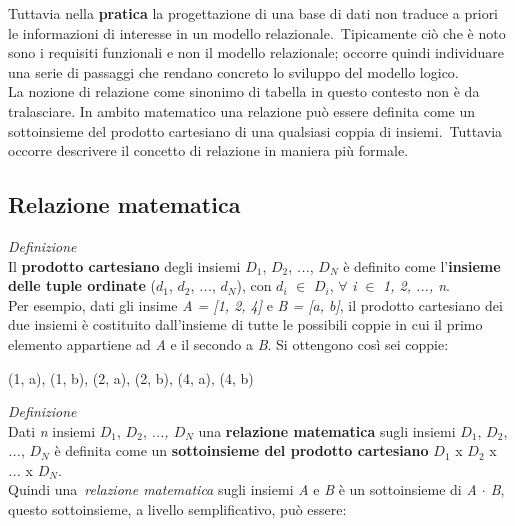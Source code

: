 \documentclass{article}
\begin{document}
Tuttavia nella \textbf{pratica} la progettazione di una base di dati non traduce a priori le informazioni di interesse in un modello relazionale.\ Tipicamente ciò che è noto sono i requisiti funzionali e non il modello relazionale; occorre quindi individuare una serie di passaggi che rendano concreto lo sviluppo del modello logico.\\
La nozione di relazione come sinonimo di tabella in questo contesto non è da tralasciare. In ambito matematico una relazione può essere definita come un sottoinsieme del prodotto cartesiano di una qualsiasi coppia di insiemi.\ Tuttavia occorre descrivere il concetto di relazione in maniera più formale.
\subsection*{Relazione matematica}
\large
\textit{Definizione}\\Il \textbf{prodotto cartesiano} degli insiemi \textit{$D_1$}, \textit{$D_2$}, \textit{...}, \textit{$D_N$} è definito come l'\textbf{insieme delle tuple ordinate} (\textit{$d_1$}, \textit{$d_2$}, \textit{...}, \textit{$d_N$}), con \textit{$d_i$} $\in$ \textit{$D_i$}, $\forall$ \textit{i} $\in$ \textit{1, 2, ..., n}.\vspace{14pt}\\
Per esempio, dati gli insime \textit{A = [1, 2, 4]} e \textit{B = [a, b]}, il prodotto cartesiano dei due insiemi è costituito dall'insieme di tutte le possibili coppie in cui il primo elemento appartiene ad \textit{A} e il secondo a \textit{B}. Si ottengono così sei coppie:\
\vspace{-\baselineskip}
\begin{center}
    \item (1, a), (1, b), (2, a), (2, b), (4, a), (4, b)
\end{center}
\vspace{14pt}
\textit{Definizione}\\Dati \textit{n} insiemi \textit{$D_1$}, \textit{$D_2$}, \textit{..., $D_N$} una \textbf{relazione matematica} sugli insiemi \textit{$D_1$}, \textit{$D_2$}, \textit{...}, \textit{$D_N$} è definita come un \textbf{sottoinsieme del prodotto cartesiano} \textit{$D_1$} x \textit{$D_2$} x \textit{...} x \textit{$D_N$}.\vspace{14pt}\\
Quindi una\ \textit{relazione matematica} sugli insiemi \textit{A} e \textit{B} è un sottoinsieme di \textit{A $\cdot$ B}, questo sottoinsieme, a livello semplificativo, può essere:
\end{document}
